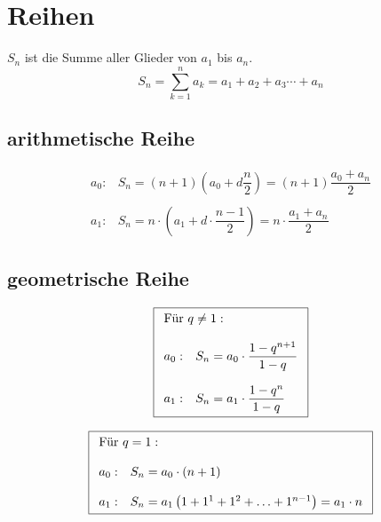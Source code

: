 



\section{Reihen}
$S_n$ ist die Summe aller Glieder von $a_1$ bis $a_n$. 
\[ \boxed{S_n = \sum_{k=1}^{n} a_k = a_1 + a_2 + a_3 \cdots + a_n} \]

\subsection{arithmetische Reihe}
\[ \boxed{\begin{matrix}
a_0 :&S_n = \left(n + 1\right)\left(a_0 + d \dfrac{n}{2}\right) = \left(n + 1\right) \dfrac{a_0 + a_n}{2}\\\\
a_1 :&S_n = n \cdot \left(a_1 + d \cdot \dfrac{n - 1}{2}\right) = n \cdot \dfrac{a_1 + a_n}{2}
\end{matrix}} \]

\subsection{geometrische Reihe}
\[ \boxed{\begin{array}{ll}
\multicolumn{2}{l}{\text{Für } q \neq 1: }\\\\
a_0 :& S_n = a_0 \cdot \dfrac{1-q^{n+1}}{1-q} \\ 
& \\
a_1 :& S_n = a_1 \cdot \dfrac{1-q^n}{1-q}
\end{array}} \]

\[ \boxed{\begin{array}{ll}
\multicolumn{2}{l}{\text{Für } q = 1: }\\\\
a_0 :& S_n = a_0 \cdot (n + 1)\\\\
a_1 :& S_n = a_1 \left(1+1^1 + 1^2 + \ldots + 1^{n-1}\right) = a_1 \cdot n
\end{array}} \]

